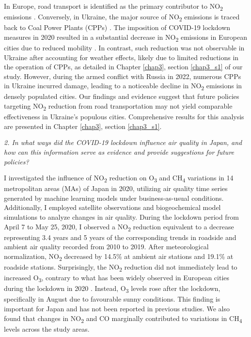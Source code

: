 In Europe, road transport is identified as the primary contributor to NO\textsubscript{2} emissions \citep{aq2020eu}. Conversely, in Ukraine, the major source of NO\textsubscript{2} emissions is traced back to Coal Power Plants (CPPs) \citep{lauri2021}. The imposition of COVID-19 lockdown measures in 2020 resulted in a substantial decrease in NO\textsubscript{2} emissions in European cities due to reduced mobility \citep{barre2021estimating, grange2021covid}. In contrast, such reduction was not observable in Ukraine after accounting for weather effects, likely due to limited reductions in the operation of CPPs, as detailed in Chapter \ref{chap3}, section \ref{chap3_s1} of our study. However, during the armed conflict with Russia in 2022, numerous CPPs in Ukraine incurred damage, leading to a noticeable decline in NO\textsubscript{2} emissions in densely populated cities. Our findings and evidence suggest that future policies targeting NO\textsubscript{2} reduction from road transportation may not yield comparable effectiveness in Ukraine's populous cities. Comprehensive results for this analysis are presented in Chapter \ref{chap3}, section \ref{chap3_s1}. \par

\textit{2. In what ways did the COVID-19 lockdown influence air quality in Japan, and how can this information serve as evidence and provide suggestions for future policies?} \par
I investigated the influence of NO\textsubscript{2} reduction on O\textsubscript{3} and CH\textsubscript{4} variations in 14 metropolitan areas (MAs) of Japan in 2020, utilizing air quality time series generated by machine learning models under business-as-usual conditions. Additionally, I employed satellite observations and biogeochemical model simulations to analyze changes in air quality. During the lockdown period from April 7 to May 25, 2020, I observed a NO\textsubscript{2} reduction equivalent to a decrease representing 3.4 years and 5 years of the corresponding trends in roadside and ambient air quality recorded from 2010 to 2019. After meteorological normalization, NO\textsubscript{2} decreased by 14.5\% at ambient air stations and 19.1\% at roadside stations. Surprisingly, the NO\textsubscript{2} reduction did not immediately lead to increased O\textsubscript{3}, contrary to what has been widely observed in European cities during the lockdown in 2020 \citep{grange2021covid,shi2021abrupt}. Instead, O\textsubscript{3} levels rose after the lockdown, specifically in August due to favourable sunny conditions. This finding is important for Japan and has not been reported in previous studies. We also found that changes in NO\textsubscript{2} and CO marginally contributed to variations in CH\textsubscript{4} levels across the study areas. \par

